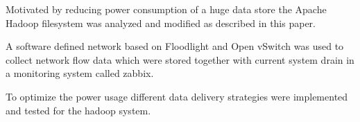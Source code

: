 Motivated by reducing power consumption of a huge data store the Apache Hadoop\textsuperscript{\textregistered} filesystem was analyzed and modified as described in this paper. 

A software defined network based on Floodlight and Open vSwitch was used to collect network flow data which were stored together with current system drain in a monitoring system called zabbix.

To optimize the power usage different data delivery strategies were implemented and tested for the hadoop system.
